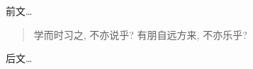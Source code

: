 \documentclass[nofonts]{ctexart}
\begin{document}
\noindent 
前文\ldots
\begin{quote}
	学而时习之, 不亦说乎?
	有朋自远方来, 不亦乐乎?
\end{quote}
后文\ldots
\end{document}
